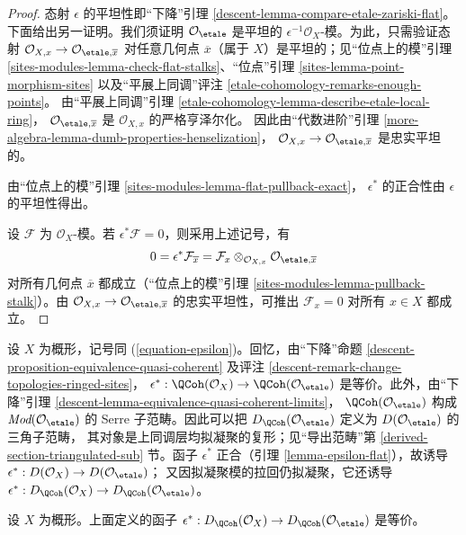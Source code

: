 \begin{proof}
态射 $\epsilon$ 的平坦性即“下降”引理
\ref{descent-lemma-compare-etale-zariski-flat}。下面给出另一证明。我们须证明
$\mathcal{O}_\etale$ 是平坦的 $\epsilon^{-1}\mathcal{O}_X$-模。为此，只需验证态射
$\mathcal{O}_{X, x} \to \mathcal{O}_{\etale, \overline{x}}$
对任意几何点 $\overline{x}$（属于 $X$）是平坦的；见“位点上的模”引理
\ref{sites-modules-lemma-check-flat-stalks}、“位点”引理
\ref{sites-lemma-point-morphism-sites} 以及“平展上同调”评注
\ref{etale-cohomology-remarks-enough-points}。
由“平展上同调”引理
\ref{etale-cohomology-lemma-describe-etale-local-ring}，
$\mathcal{O}_{\etale, \overline{x}}$ 是 $\mathcal{O}_{X, x}$ 的严格亨泽尔化。
因此由“代数进阶”引理
\ref{more-algebra-lemma-dumb-properties-henselization}，
$\mathcal{O}_{X, x} \to \mathcal{O}_{\etale, \overline{x}}$
是忠实平坦的。

\medskip\noindent
由“位点上的模”引理 \ref{sites-modules-lemma-flat-pullback-exact}，
$\epsilon^*$ 的正合性由 $\epsilon$ 的平坦性得出。

\medskip\noindent
设 $\mathcal{F}$ 为 $\mathcal{O}_X$-模。若
$\epsilon^*\mathcal{F} = 0$，则采用上述记号，有
$$
0 = \epsilon^*\mathcal{F}_{\overline{x}} =
\mathcal{F}_x \otimes_{\mathcal{O}_{X, x}} \mathcal{O}_{\etale, \overline{x}}
$$
对所有几何点 $\overline{x}$ 都成立（“位点上的模”引理
\ref{sites-modules-lemma-pullback-stalk}）。由
$\mathcal{O}_{X, x} \to \mathcal{O}_{\etale, \overline{x}}$
的忠实平坦性，可推出 $\mathcal{F}_x = 0$ 对所有 $x \in X$ 都成立。
\end{proof}

\noindent
设 $X$ 为概形，记号同 (\ref{equation-epsilon})。回忆，由“下降”命题
\ref{descent-proposition-equivalence-quasi-coherent} 及评注
\ref{descent-remark-change-topologies-ringed-sites}，
$\epsilon^* : \QCoh(\mathcal{O}_X)
\to \QCoh(\mathcal{O}_\etale)$ 是等价。此外，由“下降”引理
\ref{descent-lemma-equivalence-quasi-coherent-limits}，
$\QCoh(\mathcal{O}_\etale)$ 构成
$\textit{Mod}(\mathcal{O}_\etale)$ 的 Serre 子范畴。因此可以把
$D_\QCoh(\mathcal{O}_\etale)$ 定义为 $D(\mathcal{O}_\etale)$ 的三角子范畴，
其对象是上同调层均拟凝聚的复形；见“导出范畴”第
\ref{derived-section-triangulated-sub} 节。函子 $\epsilon^*$ 正合（引理
\ref{lemma-epsilon-flat}），故诱导
$\epsilon^* :  D(\mathcal{O}_X) \to D(\mathcal{O}_\etale)$；
又因拟凝聚模的拉回仍拟凝聚，它还诱导
$\epsilon^* : D_\QCoh(\mathcal{O}_X) \to
D_\QCoh(\mathcal{O}_\etale)$。

\begin{lemma}
\label{lemma-derived-quasi-coherent-small-etale-site}
设 $X$ 为概形。上面定义的函子
$\epsilon^* : D_\QCoh(\mathcal{O}_X) \to
D_\QCoh(\mathcal{O}_\etale)$ 是等价。
\end{lemma}

